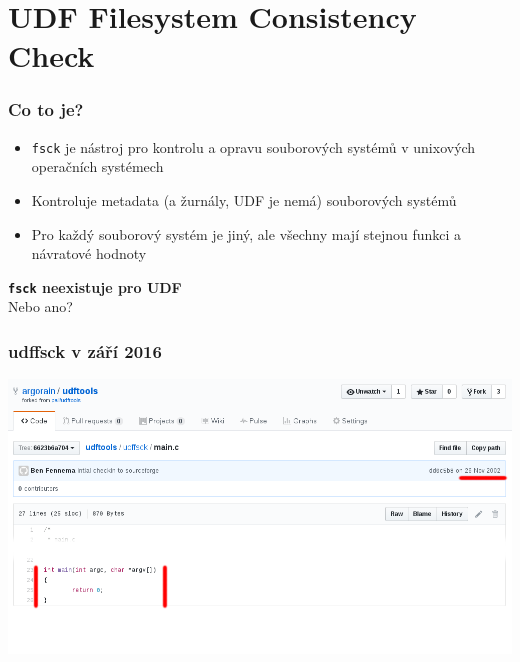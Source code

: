 \documentclass[aspectratio=169]{beamer}
\begin{document}
    \section{UDF Filesystem Consistency Check}
		\begin{frame}
			\frametitle{Co to je?}
			\vspace{40 pt}
            \begin{itemize}
                \Large\item \texttt{fsck} je nástroj pro kontrolu a opravu souborových systémů v unixových operačních systémech
                \Large\item Kontroluje metadata (a žurnály, UDF je nemá) souborových systémů
                \Large\item Pro každý souborový systém je jiný, ale všechny mají stejnou funkci a návratové hodnoty 
            \end{itemize}
            \center
            \LARGE\textbf{\texttt{fsck} neexistuje pro UDF}\\
            \Large{Nebo ano?}
		\end{frame}
        \begin{frame}
            \frametitle{udffsck v září 2016}
			\vspace{40 pt}
			\center
			\includegraphics[width=14cm]{github.png}
        \end{frame}
\end{document}
